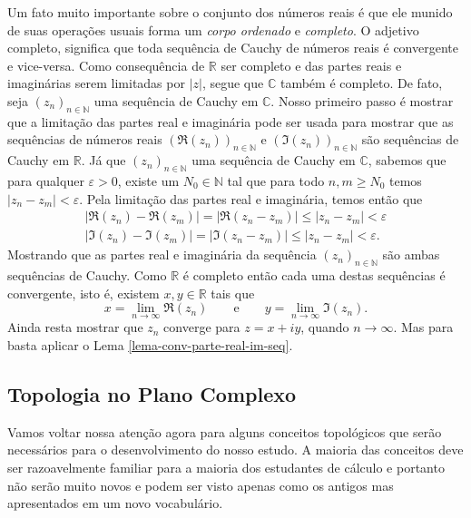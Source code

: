 Um fato muito importante sobre o conjunto dos números reais é que ele munido de suas operações usuais 
forma um \textit{corpo ordenado} e \textit{completo}.
O adjetivo completo, significa que toda sequência de Cauchy de números reais é convergente
e vice-versa. Como consequência de $\mathbb{R}$ ser completo e das
partes reais e imaginárias serem limitadas por $|z|$, 
segue que $\mathbb{C}$ também é completo. 
De fato, seja $(z_n)_{n\in\mathbb{N}}$ uma sequência de Cauchy em $\mathbb{C}$.  
Nosso primeiro passo é mostrar que a limitação das partes real
e imaginária pode ser usada para mostrar
que as sequências de números reais $(\Re(z_n))_{n\in\mathbb{N}}$ e $(\Im(z_n))_{n\in\mathbb{N}}$
são sequências de Cauchy em $\mathbb{R}$. Já que $(z_n)_{n\in\mathbb{N}}$ uma sequência de Cauchy em $\mathbb{C}$,
sabemos que para qualquer $\varepsilon>0$, existe um $N_0\in\mathbb{N}$ tal que para todo $n,m\geqslant N_0$
temos $|z_n-z_m|<\varepsilon$. Pela limitação das partes real
e imaginária, temos então que 
\begin{align*}
|\Re(z_n)-\Re(z_m)| = |\Re(z_n-z_m)|\leqslant |z_n-z_m|<\varepsilon
\\[0.2cm]
|\Im(z_n)-\Im(z_m)| = |\Im(z_n-z_m)|\leqslant |z_n-z_m|<\varepsilon.
\end{align*}
Mostrando que as partes real e imaginária da sequência $(z_n)_{n\in\mathbb{N}}$ são 
ambas sequências de Cauchy. Como $\mathbb{R}$ é completo então cada uma destas sequências 
é convergente, isto é, existem $x,y\in\mathbb{R}$ tais que 
\[
x=\lim_{n\to\infty} \Re(z_n) \qquad \text{e}\qquad 
y=\lim_{n\to\infty} \Im(z_n).
\]
Ainda resta mostrar que $z_n$ converge para $z=x+iy$, quando $n\to\infty$. 
Mas para basta aplicar o Lema \ref{lema-conv-parte-real-im-seq}.

\subsection{Topologia no Plano Complexo}

Vamos voltar nossa atenção agora para alguns conceitos topológicos que serão necessários
para o desenvolvimento do nosso estudo. A maioria das conceitos deve ser razoavelmente 
familiar para a maioria dos estudantes de cálculo e portanto não serão muito novos e
podem ser visto apenas como os antigos mas apresentados em um novo vocabulário. 


\medskip 

